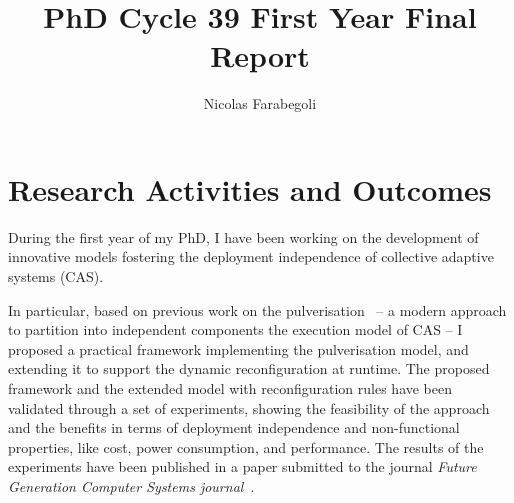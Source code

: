 \documentclass[runningheads]{llncs}
\begin{document}
%
\title{PhD Cycle 39 First Year Final Report
}
%
%
\author{Nicolas Farabegoli}
%
%
%
\maketitle              %
%

%
%
%
\section{Research Activities and Outcomes}

During the first year of my PhD,
I have been working on the development of innovative models fostering the deployment independence of collective adaptive systems (CAS).

In particular,
based on previous work on the pulverisation~\cite{DBLP:journals/iotj/CasadeiFPPSV22,DBLP:journals/fi/CasadeiPPVW20} --
a modern approach to partition into independent components the execution model of CAS --
I proposed a practical framework implementing the pulverisation model,
and extending it to support the dynamic reconfiguration at runtime.
%
The proposed framework and the extended model with reconfiguration rules have been validated through a set of experiments,
showing the feasibility of the approach and the benefits in terms of deployment independence and non-functional properties,
like cost, power consumption, and performance.
%
The results of the experiments have been published in a paper submitted to the journal \emph{Future Generation Computer Systems journal}~\cite{DBLP:journals/fgcs/FarabegoliPCV24}.
\end{document}
